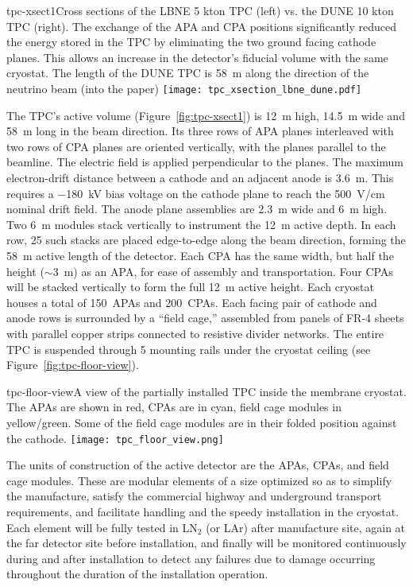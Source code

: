 \begin{cdrfigure}{tpc-xsect1}{Cross sections of the LBNE 5 kton TPC (left) vs. the DUNE 10 kton TPC (right).  The exchange of the APA and CPA positions significantly reduced the energy stored in the TPC by eliminating the two ground facing cathode planes. This allows an increase in the detector's fiducial volume with the same cryostat.  The length of the DUNE TPC is  58~m along the direction of the neutrino beam (into the paper)}
\texttt{[image: tpc\_xsection\_lbne\_dune.pdf]}
\end{cdrfigure}


The TPC's active volume (Figure~\ref{fig:tpc-xsect1}) is 12~m high, 14.5~m wide and 58~m long in the beam direction. 
Its three rows of APA planes interleaved with two rows of CPA planes 
are oriented vertically, with the planes parallel to the beamline. The  
electric field is applied perpendicular to the planes.
The maximum electron-drift distance between a cathode and an adjacent 
anode is 3.6~m. This requires a $-$180~kV bias voltage on the cathode plane to reach the 500~V/cm nominal drift field. The anode plane assemblies are 
2.3~m wide and 6~m high. Two 6~m modules stack vertically to 
instrument the 12~m active depth. In each row, 25 such stacks are placed edge-to-edge 
along the beam direction, forming the 58~m active length of the detector.  Each CPA has the same width, but half the height ($\sim$3~m) as an APA, for ease of assembly and transportation.  Four CPAs will be stacked vertically to form the full 12~m active height. 
Each cryostat houses a total of 150~APAs and 200~CPAs.
Each facing pair of cathode and anode rows is surrounded by a 
``field cage,'' assembled from panels of FR-4 sheets with parallel copper strips connected to resistive divider networks. 
The entire TPC is suspended through 5 mounting rails under the cryostat ceiling (see Figure~\ref{fig:tpc-floor-view}).


\begin{cdrfigure}{tpc-floor-view}{A view of the partially installed TPC inside the membrane cryostat.  The APAs are shown in red, CPAs are in cyan, field cage modules in yellow/green. Some of the field cage modules are in their folded position against the cathode.}
\texttt{[image: tpc\_floor\_view.png]}
\end{cdrfigure}

The units of construction of the active detector are the APAs, CPAs, and field cage modules. These are modular elements of a size optimized
so as to simplify the manufacture, satisfy the commercial highway and underground transport requirements,
and facilitate handling and the speedy installation in the cryostat.  Each element will be fully tested in LN$_2$ (or LAr) after manufacture site,
again at the far detector site before installation, and finally will be monitored continuously during and
after installation to detect any failures due to damage occurring throughout the duration
of the installation operation. 


